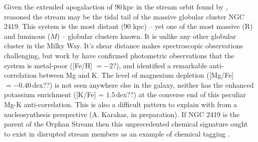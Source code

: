 \documentclass{emulateapj}
\begin{document}




Given the extended apogalaction of 90\,kpc in the stream orbit found by \citet{newberg;et-al_2010}, \citet{bruns;kroupa_2011} reasoned the stream may be the tidal tail of the massive globular cluster NGC 2419. This system is the most distant (90 kpc) -- yet one of the most massive (R) and luminous ($M$) -- globular clusters known. It is unlike any other globular cluster in the Milky Way. It's shear distance makes spectroscopic observations challenging, but work by \citet{cohen;et-al} have confirmed photometric observations \citet{photometry_for_ngc2419} that the system is metal-poor ([Fe/H] $= -2?$), and identified a remarkable anti-correlation between Mg and K. The level of magnesium depletion ([Mg/Fe] $= -0.40$\,dex??) is not seen anywhere else in the galaxy, neither has the enhanced potassium enrichment ([K/Fe] = $1.5$\,dex??) at the converse end of this peculiar Mg-K anti-correlation. This is also a difficult pattern to explain with from a nucleosynthesis perspective (A. Karakas, in preparation). If NGC 2419 is the parent of the Orphan Stream then this unprecedented chemical signature ought to exist in disrupted stream members as an example of chemical tagging \citep[e.g. see][]{freeman;bland-hawthorn_2002,de_silva;et-al_2007,wylie-de-boer;et-al_2010,majewski;et-al_2012}.
\end{document}
